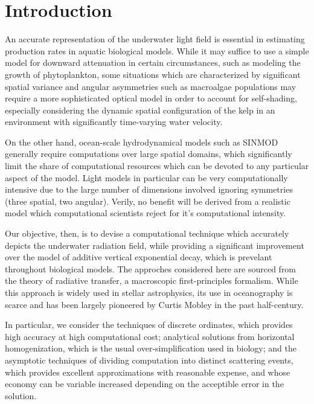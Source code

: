 \documentclass[10pt]{article}
\begin{document}


\section{Introduction}
An accurate representation of the underwater light field is essential in
estimating production rates in aquatic biological models. While it may suffice
to use a simple model for downward attenuation in certain circumstances, such as
modeling the growth of phytoplankton, some situations which are characterized by
significant spatial variance and angular asymmetries such as macroalgae
populations may require a more sophisticated optical model in order to account
for self-shading, especially considering the dynamic spatial configuration of
the kelp in an environment with significantly time-varying water velocity.

On the other hand, ocean-scale hydrodynamical models such as SINMOD generally require
computations over large spatial domains, which significantly limit the share of
computational resources which can be devoted to any particular aspect of the
model. Light models in particular can be very computationally intensive due to
the large number of dimensions involved ignoring symmetries (three spatial, two
angular). Verily, no benefit will be derived from a realistic model which
computational scientists reject for it's computational intensity.

Our objective, then, is to devise a computational technique which accurately
depicts the underwater radiation field, while providing a significant
improvement over the model of additive vertical exponential decay, which is
prevelant throughout biological models. The approches considered here are
sourced from the theory of radiative transfer, a macroscopic first-principles
formalism. While this approach is widely used in stellar astrophysics, its use
in oceanography is scarce and has been largely pioneered by Curtis Mobley in the
past half-century.

In particular, we consider the techniques of discrete ordinates, which provides
high accuracy at high computational cost; analytical solutions from horizontal
homogenization, which is the usual over-simplification used in biology; and the
asymptotic techniques of dividing computation into distinct scattering
events, which provides excellent approximations with reasonable expense, and
whose economy can be variable increased depending on the acceptible error in
the solution.
  
\end{document}
